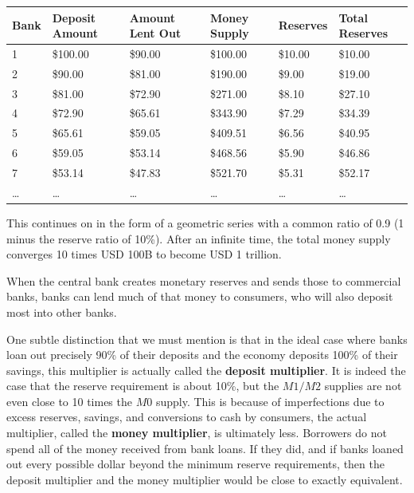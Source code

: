 \documentclass{article}
\begin{document}
\begin{example}
      \begin{tabular}{|l|l|l|l|l|l|}
        \hline
        Bank & Deposit Amount & Amount Lent Out & Money Supply & Reserves & Total Reserves \\
        \hline
        1 & \$100.00 & \$90.00 & \$100.00 & \$10.00 & \$10.00 \\
        2 & \$90.00 & \$81.00 & \$190.00 & \$9.00 & \$19.00 \\
        3 & \$81.00 & \$72.90 & \$271.00 & \$8.10 & \$27.10 \\
        4 & \$72.90 & \$65.61 & \$343.90 & \$7.29 & \$34.39 \\
        5 & \$65.61 & \$59.05 & \$409.51 & \$6.56 & \$40.95 \\
        6 & \$59.05 & \$53.14 & \$468.56 & \$5.90 & \$46.86 \\
        7 & \$53.14 & \$47.83 & \$521.70 & \$5.31 & \$52.17 \\
        \ldots & \ldots & \ldots & \ldots & \ldots & \ldots \\
        \hline
      \end{tabular}
      This continues on in the form of a geometric series with a common ratio of 0.9 (1 minus the reserve ratio of 10\%). After an infinite time, the total money supply converges 10 times USD 100B to become USD 1 trillion.
    \end{example}

    \begin{definition}
      When the central bank creates monetary reserves and sends those to commercial banks, banks can lend much of that money to consumers, who will also deposit most into other banks. 
    \end{definition}

    One subtle distinction that we must mention is that in the ideal case where banks loan out precisely 90\% of their deposits and the economy deposits 100\% of their savings, this multiplier is actually called the \textbf{deposit multiplier}. It is indeed the case that the reserve requirement is about 10\%, but the $M1/M2$ supplies are not even close to 10 times the $M0$ supply. This is because of imperfections due to excess reserves, savings, and conversions to cash by consumers, the actual multiplier, called the \textbf{money multiplier}, is ultimately less. Borrowers do not spend all of the money received from bank loans. If they did, and if banks loaned out every possible dollar beyond the minimum reserve requirements, then the deposit multiplier and the money multiplier would be close to exactly equivalent.
\end{document}
